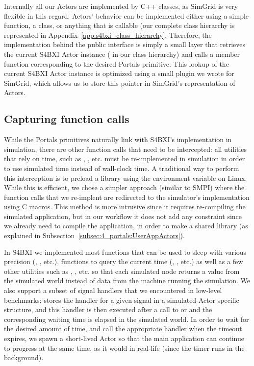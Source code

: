 Internally all our Actors are implemented by C++ classes, as SimGrid is very
flexible in this regard: Actors' behavior can be implemented either using a
simple function, a class, or anything that is callable (our complete class
hierarchy is represented in Appendix~\ref{app:s4bxi_class_hierarchy}. Therefore,
the implementation behind the public interface is simply a small layer that
retrieves the current S4BXI Actor instance ( in our class
hierarchy) and calls a member function corresponding to the desired Portals
primitive. This lookup of the current S4BXI Actor instance is optimized using a
small plugin we wrote for SimGrid, which allows us to store this pointer in
SimGrid's representation of Actors.

\subsection{Capturing function calls}

While the Portals primitives naturally link with S4BXI's implementation in
simulation, there are other function calls that need to be
intercepted: all utilities that rely on time, such as
, , etc. must be
re-implemented in simulation in order to use simulated time instead of
wall-clock time. A traditional way to perform this interception is to preload a
library using the  environment variable on Linux. While
this is efficient, we chose a simpler approach (similar to SMPI) where the
function calls that we re-implent are redirected to the simulator's
implementation using  C macros. This method is more intrusive
since it requires re-compiling the simulated application, but in our workflow it
does not add any constraint since we already need to compile the application, in
order to make a shared library (as explained in
Subsection~\ref{subsec:4_portals:UserAppActors}).

In S4BXI we implemented most functions that can be used to sleep with various
precision (, , etc.), functions to query the
current time (, , etc.) as well as a
few other utilities such as , , etc. so that
each simulated node returns a value from the simulated world instead of data
from the machine running the simulation. We also support a subset of signal
handlers that we encountered in low-level benchmarks:  stores
the handler for a given signal in a simulated-Actor specific structure, and this
handler is then executed after a call to  or 
and the corresponding waiting time is elapsed in the simulated world. In order
to wait for the desired amount of time, and call the appropriate handler when
the timeout expires, we spawn a short-lived Actor so that the main application
can continue to progress at the same time, as it would in real-life (since the
timer runs in the background).

